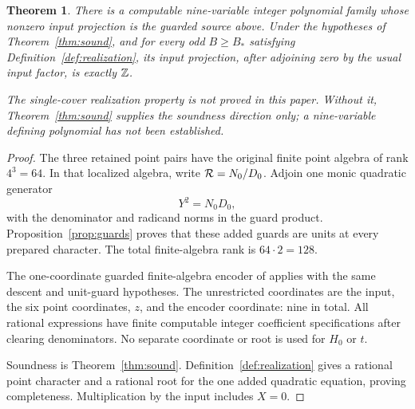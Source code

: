\documentclass[11pt,a4paper]{article}
\newtheorem{theorem}{Theorem}[section]
\begin{document}
\begin{theorem}\label{thm:count}
There is a computable nine-variable integer polynomial family whose
nonzero input projection is the guarded source above. Under the
hypotheses of Theorem~\ref{thm:sound}, and for every odd \(B\ge B_*\)
satisfying Definition~\ref{def:realization}, its input projection,
after adjoining zero by the usual input factor, is exactly \(\mathbb Z\).

The single-cover realization property is not proved in this paper.
Without it, Theorem~\ref{thm:sound} supplies the soundness direction
only; a nine-variable defining polynomial has not been established.
\end{theorem}
\begin{proof}
The three retained point pairs have the original finite point algebra
of rank \(4^3=64\). In that localized algebra, write
\({\cal R}=N_0/D_0\). Adjoin one monic quadratic generator
\[
 Y^2=N_0D_0,
\]
with the denominator and radicand norms in the guard product.
Proposition~\ref{prop:guards} proves that these added guards are units
at every prepared character. The total finite-algebra rank is
\(64\cdot2=128\).

The one-coordinate guarded finite-algebra encoder of \cite{Unit}
applies with the same descent and unit-guard hypotheses.
The unrestricted coordinates are the input, the six point coordinates,
\(z\), and the encoder coordinate: nine in total.
All rational expressions have finite computable integer coefficient
specifications after clearing denominators. No separate coordinate
or root is used for \(H_0\) or \(t\).

Soundness is Theorem~\ref{thm:sound}.
Definition~\ref{def:realization} gives a rational point character and
a rational root for the one added quadratic equation, proving
completeness. Multiplication by the input includes \(X=0\).
\end{proof}
\end{document}
